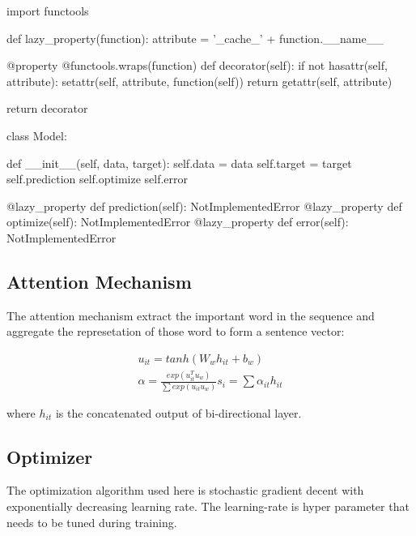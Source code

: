 \documentclass{article}
\begin{document}
\begin{python}

        import functools

        def lazy_property(function):
                attribute = '_cache_' + function.__name__

                @property
                @functools.wraps(function)
                def decorator(self):
                        if not hasattr(self, attribute):
                        setattr(self, attribute, function(self))
                        return getattr(self, attribute)

                return decorator
\end{python}


\begin{python}
        class Model:

        def __init__(self, data, target):
                self.data = data
                self.target = target
                self.prediction
                self.optimize
                self.error

        @lazy_property
        def prediction(self):
                NotImplementedError
        @lazy_property
        def optimize(self):
                NotImplementedError
        @lazy_property
        def error(self):
                NotImplementedError


\end{python}

\subsection{Attention Mechanism}
The attention mechanism extract the important word in the sequence and aggregate the represetation of those word to form a sentence vector:

\begin{align}
        u_{it} = tanh(W_w h_{it} + b_w) \\
        \alpha = \frac{exp(u_{it}^T u_w)}{\sum exp(u_{it} u_w)}
        s_i = \sum \alpha_{it} h_{it}
\end{align}

where $h_{it}$ is the concatenated output of bi-directional layer.

\subsection{Optimizer}
The optimization algorithm used here is stochastic gradient decent with exponentially decreasing learning rate. The learning-rate is hyper parameter that needs to be tuned during training. 




\end{document}
